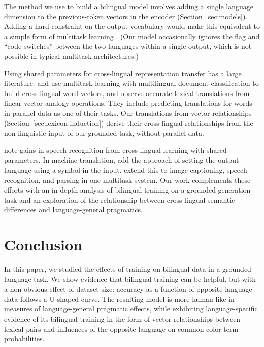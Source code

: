 \documentclass[11pt,a4paper]{article}
\renewcommand{\|}{\mid}
\newcommand{\secref}[1]{Section~\ref{#1}}
\begin{document}
The method we use to build a bilingual model involves adding a single language dimension to the previous-token vectors in the encoder (\secref{sec:models}). 
Adding a hard constraint on the output vocabulary
would make this equivalent to a simple form of multitask learning \citep{Caruana1997,Collobert2008}.
(Our model occasionally ignores the flag
and ``code-switches'' between the two languages within a single output, which is not possible in typical multitask architectures.)

Using shared parameters for cross-lingual representation transfer has a large literature.
\citet{Klementiev2012} and \citet{Hermann2014} use multitask learning with multilingual document classification to build cross-lingual
word vectors, and observe accurate lexical translations from linear vector analogy operations. They include predicting translations for
words in parallel data as one of their tasks. Our translations from vector relationships (\secref{sec:lexicon-induction}) derive their cross-lingual
relationships from the non-linguistic input of our grounded task, without parallel data.

\citet{Huang2013} note gains in speech recognition from cross-lingual learning with shared parameters. In machine translation,
\citet{Johnson2016} add the approach of setting the output language using a symbol in the input. 
\citet{Kaiser2017} extend this to image captioning, speech recognition, and parsing in one multitask system.
Our work complements these efforts with an in-depth analysis of bilingual training on a 
grounded generation task and an exploration of the relationship between cross-lingual semantic differences 
and language-general pragmatics.

\section{Conclusion}

In this paper, we studied the effects of training on bilingual data in a grounded language task. We show evidence that
bilingual training can be helpful, but with a non-obvious effect of dataset size: accuracy as a function of opposite-language
data follows a U-shaped curve. The resulting model is more human-like in measures of language-general pragmatic effects, while
exhibiting language-specific evidence of its bilingual training in the form of vector relationships between lexical pairs
and influences of the opposite language on common color-term probabilities.
\end{document}
